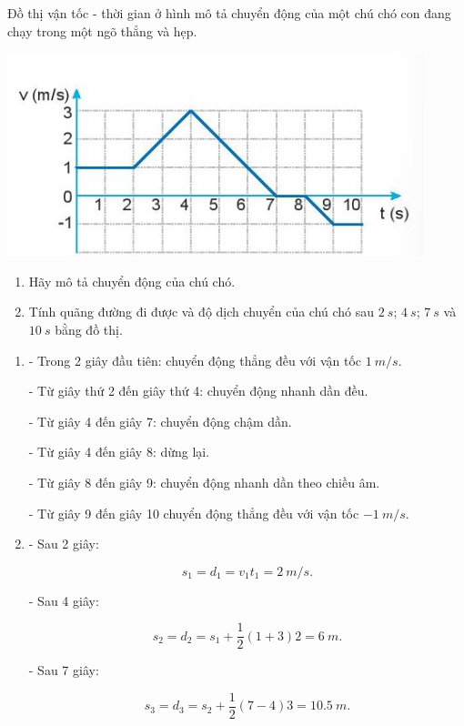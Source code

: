 \begin{enumerate}[label=\bfseries Bài \arabic*:,leftmargin=1.5cm]
	
	{Đồ thị vận tốc - thời gian ở hình mô tả chuyển động của một chú chó con đang chạy trong một ngõ thẳng và hẹp.
		\begin{center}
			\includegraphics[scale=1]{../figs/VN10-2022-PH-TP012-5.jpg}
		\end{center}
		
		\begin{enumerate}[label=\alph*)]
			\item Hãy mô tả chuyển động của chú chó.
			\item Tính quãng đường đi được và độ dịch chuyển của chú chó sau $\SI{2}{s}$; $\SI{4}{s}$; $\SI{7}{s}$ và $\SI{10}{s}$ bằng đồ thị.
		\end{enumerate}
	}
	
	\hideall
	{	
		\begin{enumerate}[label=\alph*)]
			\item 
			- Trong 2 giây đầu tiên: chuyển động thẳng đều với vận tốc $\SI{1}{m/s}$.
			
			- Từ giây thứ 2 đến giây thứ 4: chuyển động nhanh dần đều.
			
			- Từ giây 4 đến giây 7: chuyển động chậm dần.
			
			- Từ giây 4 đến giây 8: dừng lại.
			
			- Từ giây 8 đến giây 9: chuyển động nhanh dần theo chiều âm.
			
			- Từ giây 9 đến giây 10 chuyển động thẳng đều với vận tốc $-\SI{1}{m/s}$.
			
			
			\item 
			- Sau 2 giây:
			
			$$s_1 = d_1 = v_1 t_1 = \SI{2}{m/s}.$$
			
			- Sau 4 giây:
			
			$$s_2 = d_2 = s_1 + \dfrac{1}{2} (1+3)2 = \SI{6}{m}.$$
			
			- Sau 7 giây:
			
			$$s_3 =d_3= s_2 + \dfrac{1}{2} (7-4)3 = \SI{10,5}{m}.$$
		

\end{enumerate}}
\end{enumerate}
